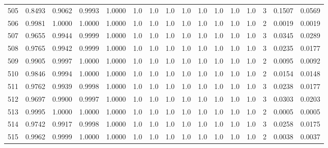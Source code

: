 \begin{tabular}{lrrrrrrrrrrrrrrr}
505 &      0.8493 &  0.9062 &  0.9993 &  1.0000 &     1.0 &     1.0 &     1.0 &     1.0 &     1.0 &     1.0 &      1.0 &        1.0 &      3 &                    0.1507 &                     0.0569 \\
506 &      0.9981 &  1.0000 &  1.0000 &  1.0000 &     1.0 &     1.0 &     1.0 &     1.0 &     1.0 &     1.0 &      1.0 &        1.0 &      2 &                    0.0019 &                     0.0019 \\
507 &      0.9655 &  0.9944 &  0.9999 &  1.0000 &     1.0 &     1.0 &     1.0 &     1.0 &     1.0 &     1.0 &      1.0 &        1.0 &      3 &                    0.0345 &                     0.0289 \\
508 &      0.9765 &  0.9942 &  0.9999 &  1.0000 &     1.0 &     1.0 &     1.0 &     1.0 &     1.0 &     1.0 &      1.0 &        1.0 &      3 &                    0.0235 &                     0.0177 \\
509 &      0.9905 &  0.9997 &  1.0000 &  1.0000 &     1.0 &     1.0 &     1.0 &     1.0 &     1.0 &     1.0 &      1.0 &        1.0 &      2 &                    0.0095 &                     0.0092 \\
510 &      0.9846 &  0.9994 &  1.0000 &  1.0000 &     1.0 &     1.0 &     1.0 &     1.0 &     1.0 &     1.0 &      1.0 &        1.0 &      2 &                    0.0154 &                     0.0148 \\
511 &      0.9762 &  0.9939 &  0.9998 &  1.0000 &     1.0 &     1.0 &     1.0 &     1.0 &     1.0 &     1.0 &      1.0 &        1.0 &      3 &                    0.0238 &                     0.0177 \\
512 &      0.9697 &  0.9900 &  0.9997 &  1.0000 &     1.0 &     1.0 &     1.0 &     1.0 &     1.0 &     1.0 &      1.0 &        1.0 &      3 &                    0.0303 &                     0.0203 \\
513 &      0.9995 &  1.0000 &  1.0000 &  1.0000 &     1.0 &     1.0 &     1.0 &     1.0 &     1.0 &     1.0 &      1.0 &        1.0 &      2 &                    0.0005 &                     0.0005 \\
514 &      0.9742 &  0.9917 &  0.9998 &  1.0000 &     1.0 &     1.0 &     1.0 &     1.0 &     1.0 &     1.0 &      1.0 &        1.0 &      3 &                    0.0258 &                     0.0175 \\
515 &      0.9962 &  0.9999 &  1.0000 &  1.0000 &     1.0 &     1.0 &     1.0 &     1.0 &     1.0 &     1.0 &      1.0 &        1.0 &      2 &                    0.0038 &                     0.0037 \\

\end{tabular}
